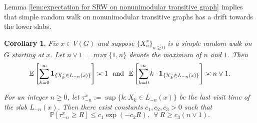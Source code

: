 \documentclass[12pt]{article}
\newtheorem{corollary}[theorem]{Corollary}
\numberwithin{equation}{section}
\newcommand{\be}{\begin{equation}}
\newcommand{\ee}{\end{equation}}
\newcommand{\1}{\mathbf{1}}
\begin{document}
Lemma \ref{lem:expectation for SRW on nonunimodular transitive graph} implies that simple random walk on nonunimodular transitive graphs has a drift towards the lower slabs. %
 
 \begin{corollary}\label{cor:large deviation for SRW on nonunimodular transitive graph}
 	Fix $x\in V(G)$ and suppose $\{X_n^x\}_{n\geq0}$ is a simple random walk on $G$ starting at $x$. Let $n\vee 1=\max\{ 1,n\}$ denote the maximum of $n$ and $1$.
  	Then 
 	\be\label{eq: occupation times for srw on -n slab}
 	\mathbb{E}\left[\sum_{k=0}^{\infty}\mathbf{1}_{\{X_k^x\in L_{-n}(x) \}}\right]\asymp 1
 	\ \textnormal{ and }\ 
 	\mathbb{E}\left[\sum_{k=0}^{\infty}k\cdot\mathbf{1}_{\{X_k^x\in L_{-n}(x) \}}\right]\asymp n\vee 1.
 	\ee
 	
 	
 	
 	For an integer $n\geq0$, let $\tau_{-n}^x:=\sup\{k:X_k\in L_{-n}(x)\}$ be the last visit time of the slab $L_{-n}(x)$. Then there exist constants $c_1,c_2,c_3>0$ such that 
 	\be \label{eq:tail probability for last visit time of SRW with a fixed level}
 	\mathbb{P}[\tau_{-n}^x\geq R]\leq c_1\exp(-c_2R),\ \ \forall \ R\geq c_3(n\vee 1).
 	\ee
 \end{corollary}
\end{document}
